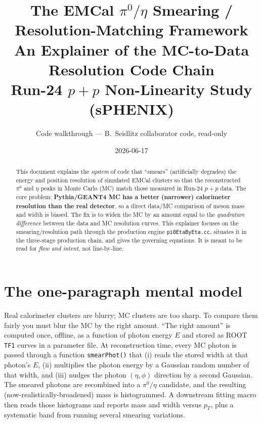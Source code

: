 \documentclass[11pt]{article}
\title{\textbf{The EMCal $\pi^0/\eta$ Smearing / Resolution-Matching Framework}\\[4pt]
\large An Explainer of the MC-to-Data Resolution Code Chain\\
\normalsize Run-24 $p{+}p$ Non-Linearity Study (sPHENIX)}
\author{Code walkthrough --- B.\ Seidlitz collaborator code, read-only}
\date{2026-06-17}
\begin{document}
\maketitle

\begin{abstract}
\noindent This document explains the \emph{system} of code that ``smears'' (artificially
degrades) the energy and position resolution of simulated EMCal clusters so that
the reconstructed $\pi^0$ and $\eta$ peaks in Monte Carlo (MC) match those measured
in Run-24 $p{+}p$ data. The core problem: \textbf{Pythia/GEANT4 MC has a
better (narrower) calorimeter resolution than the real detector}, so a direct
data/MC comparison of meson mass and width is biased. The fix is to widen the MC
by an amount equal to the \emph{quadrature difference} between the data and MC
resolution curves. This explainer focuses on the smearing/resolution path through
the production engine \texttt{pi0EtaByEta.cc}, situates it in the three-stage
production chain, and gives the governing equations. It is meant to be read for
\emph{flow and intent}, not line-by-line.
\end{abstract}

\tableofcontents
\vspace{1em}

\section{The one-paragraph mental model}
Real calorimeter clusters are blurry; MC clusters are too sharp. To compare them
fairly you must blur the MC by the right amount. ``The right amount'' is computed
once, offline, as a function of photon energy $E$ and stored as ROOT \texttt{TF1}
curves in a parameter file. At reconstruction time, every MC photon is passed
through a function \texttt{smearPhot()} that (i) reads the stored width at that
photon's $E$, (ii) multiplies the photon energy by a Gaussian random number of
that width, and (iii) nudges the photon $(\eta,\phi)$ direction by a second
Gaussian. The smeared photons are recombined into a $\pi^0/\eta$ candidate, and
the resulting (now-realistically-broadened) mass is histogrammed. A downstream
fitting macro then reads those histograms and reports mass and width versus $p_T$,
plus a systematic band from running several smearing variations.

\end{document}
